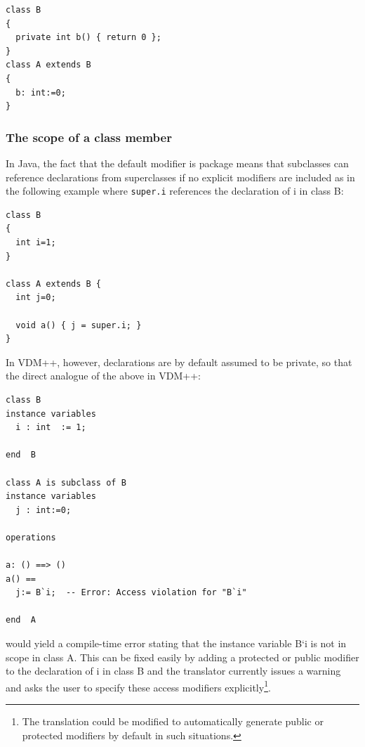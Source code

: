 \documentclass[\pformat,12pt]{article}
\begin{document}
\begin{small}
\begin{verbatim}
class B
{
  private int b() { return 0 };
}
class A extends B
{ 
  b: int:=0;
}
\end{verbatim}
\end{small}

\subsubsection{The scope of a class member}

In Java, the fact that the default modifier is package means that
subclasses can reference declarations from superclasses if no explicit
modifiers are included as in the following example where
\texttt{super.i} references the declaration of i in class B: 

\begin{small}
\begin{verbatim}
class B
{
  int i=1;
}

class A extends B {
  int j=0;

  void a() { j = super.i; }
}
\end{verbatim}
\end{small}

In VDM++, however, declarations are by default assumed to be private,
so that the direct analogue of the above in VDM++:

\begin{small}
\begin{verbatim}
class B
instance variables 
  i : int  := 1;
  
end  B

class A is subclass of B
instance variables 
  j : int:=0;

operations

a: () ==> ()
a() == 
  j:= B`i;  -- Error: Access violation for "B`i"

end  A
\end{verbatim}
\end{small}

would yield a compile-time error stating that the instance variable B`i is
not in scope in class A. This can be fixed easily by adding a
protected or public modifier to the declaration of i in class B and
the translator currently issues a warning and asks the user to specify
these access modifiers explicitly\footnote{The translation could be
  modified to automatically generate public or protected modifiers by
  default in such situations.}.
\end{document}
